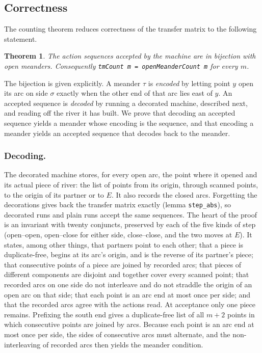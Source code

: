 \documentclass[11pt]{amsart}
\newtheorem{theorem}{Theorem}[section]
\theoremstyle{definition}
\theoremstyle{remark}
\newcommand{\code}[1]{\texttt{#1}}
\begin{document}
\subsection{Correctness}
The counting theorem reduces correctness of the transfer matrix to the following statement.

\begin{theorem}\label{thm:tm}
The action sequences accepted by the machine are in bijection with open meanders. Consequently
\code{tmCount m = openMeanderCount m} for every $m$.
\end{theorem}

The bijection is given explicitly. A meander $\tau$ is \emph{encoded} by letting point $y$ open
its arc on side $\sigma$ exactly when the other end of that arc lies east of $y$. An accepted
sequence is \emph{decoded} by running a decorated machine, described next, and reading off the
river it has built. We prove that decoding an accepted sequence yields a meander whose encoding
is the sequence, and that encoding a meander yields an accepted sequence that decodes back to
the meander.

\subsubsection*{Decoding.}
The decorated machine stores, for every open arc, the point where it opened and its actual
piece of river: the list of points from its origin, through scanned points, to the origin of
its partner or to $E$. It also records the closed arcs. Forgetting the decorations gives back
the transfer matrix exactly (lemma \code{step\_abs}), so decorated runs and plain runs accept
the same sequences. The heart of the proof is an invariant with twenty conjuncts, preserved by
each of the five kinds of step (open--open, open--close for either side, close--close, and the two
moves at $E$). It states, among other things, that partners point to each other; that a piece
is duplicate-free, begins at its arc's origin, and is the reverse of its partner's piece;
that consecutive points of a piece are joined by recorded arcs; that pieces of different
components are disjoint and together cover every scanned point; that recorded arcs on one side
do not interleave and do not straddle the origin of an open arc on that side; that each point
is an arc end at most once per side; and that the recorded arcs agree with the actions read.
At acceptance only one piece remains. Prefixing the south end gives a duplicate-free list of
all $m+2$ points in which consecutive points are joined by arcs. Because each point is an arc
end at most once per side, the sides of consecutive arcs must alternate, and the
non-interleaving of recorded arcs then yields the meander condition.
\end{document}
